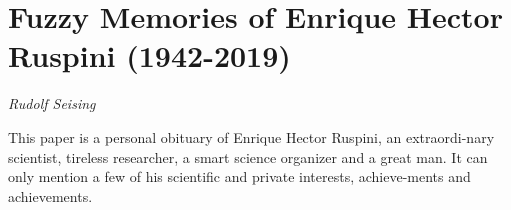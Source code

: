 \documentclass[../booklet.tex]{subfiles}
\begin{document}
\section[Fuzzy Memories of Enrique Hector Ruspini (1942-2019). {\it Rudolf Seising}]{Fuzzy Memories of Enrique Hector Ruspini (1942-2019)}

\begin{center}
  {\it Rudolf Seising}
\end{center}

\vskip 0.8cm

This paper is a personal obituary of Enrique Hector Ruspini, an extraordi-nary scientist, tireless researcher, a smart science organizer and a great man. It can only mention a few of his scientific and private interests, achieve-ments and achievements.
\end{document}
